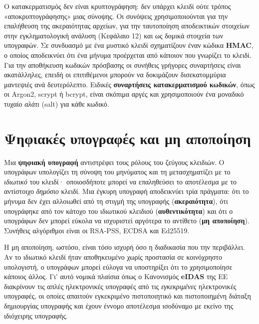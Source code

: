 \documentclass[11pt,openany]{book}
\begin{document}
Ο κατακερματισμός δεν είναι κρυπτογράφηση: δεν υπάρχει κλειδί ούτε τρόπος «αποκρυπτογράφησης» μιας σύνοψης. Οι συνόψεις χρησιμοποιούνται για την επαλήθευση της ακεραιότητας αρχείων, για την ταυτοποίηση αποδεικτικών στοιχείων στην εγκληματολογική ανάλυση (Κεφάλαιο 12) και ως δομικά στοιχεία των υπογραφών. Σε συνδυασμό με ένα μυστικό κλειδί σχηματίζουν έναν κώδικα \textbf{HMAC}, ο οποίος αποδεικνύει ότι ένα μήνυμα προέρχεται από κάποιον που γνωρίζει το κλειδί. Για την αποθήκευση κωδικών πρόσβασης οι συνήθεις γρήγορες συναρτήσεις είναι ακατάλληλες, επειδή οι επιτιθέμενοι μπορούν να δοκιμάζουν δισεκατομμύρια μαντεψιές ανά δευτερόλεπτο. Ειδικές \textbf{συναρτήσεις κατακερματισμού κωδικών}, όπως οι Argon2, scrypt ή bcrypt, είναι σκόπιμα αργές και χρησιμοποιούν ένα μοναδικό τυχαίο \emph{αλάτι} (salt) για κάθε κωδικό.

\section{Ψηφιακές υπογραφές και μη αποποίηση}\label{sec:7.3}
Μια \textbf{ψηφιακή υπογραφή} αντιστρέφει τους ρόλους του ζεύγους κλειδιών. Ο υπογράφων υπολογίζει τη σύνοψη του μηνύματος και τη μετασχηματίζει με το \emph{ιδιωτικό} του κλειδί· οποιοσδήποτε μπορεί να επαληθεύσει το αποτέλεσμα με το αντίστοιχο \emph{δημόσιο} κλειδί. Μια έγκυρη υπογραφή αποδεικνύει τρία πράγματα: ότι το μήνυμα δεν έχει αλλοιωθεί από τη στιγμή της υπογραφής (\textbf{ακεραιότητα}), ότι υπογράφηκε από τον κάτοχο του ιδιωτικού κλειδιού (\textbf{αυθεντικότητα}) και ότι ο υπογράφων δεν μπορεί εύκολα να ισχυριστεί αργότερα το αντίθετο (\textbf{μη αποποίηση}). Συνήθεις αλγόριθμοι είναι οι RSA-PSS, ECDSA και Ed25519.

Η μη αποποίηση, ωστόσο, είναι τόσο ισχυρή όσο η διαδικασία που την περιβάλλει. Αν το ιδιωτικό κλειδί ήταν αποθηκευμένο χωρίς προστασία σε κοινόχρηστο υπολογιστή, ο υπογράφων μπορεί εύλογα να υποστηρίξει ότι το χρησιμοποίησε κάποιος άλλος. Γι' αυτό νομικά πλαίσια όπως ο Κανονισμός \textbf{eIDAS} της ΕΕ διακρίνουν τις απλές ηλεκτρονικές υπογραφές από τις \emph{εγκεκριμένες} ηλεκτρονικές υπογραφές, οι οποίες απαιτούν εγκεκριμένο πιστοποιητικό και πιστοποιημένη διάταξη δημιουργίας υπογραφής και έχουν έννομο αποτέλεσμα ισοδύναμο με εκείνο της ιδιόχειρης υπογραφής.
\end{document}
